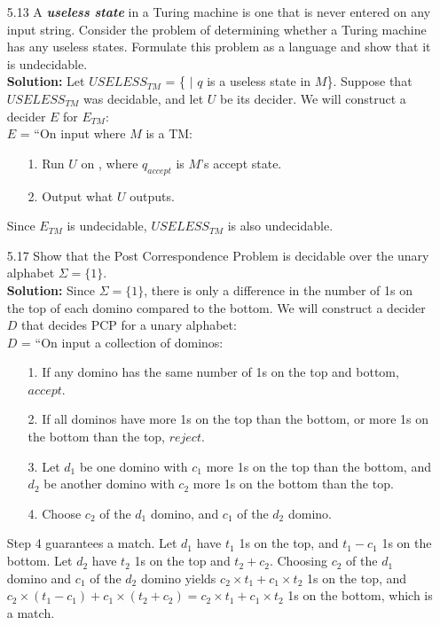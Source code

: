 \begin{enumerate}
\item[5.13]A \emph{\textbf{useless state}} in a Turing machine is one that is never entered on any input string. Consider the problem of determining whether a Turing machine has any useless states. Formulate this problem as a language and show that it is undecidable.
\\
\textbf{Solution:} Let $USELESS_{TM}$ = \{ $|$ $q$ is a useless state in $M$\}. Suppose that $USELESS_{TM}$ was decidable, and let $U$ be its decider. We will construct a decider $E$ for $E_{TM}$:
\\
$E$ = ``On input  where $M$ is a TM:
\begin{enumerate}
\itemsep0em
\item[1.]Run $U$ on , where $q_{accept}$ is $M$'s accept state.
\item[2.]Output what $U$ outputs.
\end{enumerate}
Since $E_{TM}$ is undecidable, $USELESS_{TM}$ is also undecidable.

\item[5.17]Show that the Post Correspondence Problem is decidable over the unary alphabet $\Sigma = \{1\}$.
\\
\textbf{Solution:} Since $\Sigma = \{1\}$, there is only a difference in the number of 1s on the top of each domino compared to the bottom. We will construct a decider $D$ that decides PCP for a unary alphabet:
\\
$D$ = ``On input a collection of dominos:
\begin{enumerate}
\itemsep0em
\item[1.]If any domino has the same number of 1s on the top and bottom, $accept$.
\item[2.]If all dominos have more 1s on the top than the bottom, or more 1s on the bottom than the top, $reject$.
\item[3.]Let $d_1$ be one domino with $c_1$ more 1s on the top than the bottom, and $d_2$ be another domino with $c_2$ more 1s on the bottom than the top.
\item[4.]Choose $c_2$ of the $d_1$ domino, and $c_1$ of the $d_2$ domino.
\end{enumerate}
Step 4 guarantees a match. Let $d_1$ have $t_1$ 1s on the top, and $t_1 - c_1$ 1s on the bottom. Let $d_2$ have $t_2$ 1s on the top and $t_2 + c_2$. Choosing $c_2$ of the $d_1$ domino and $c_1$ of the $d_2$ domino yields $c_2 \times t_1 + c_1 \times t_2$ 1s on the top, and $c_2 \times (t_1 - c_1) + c_1 \times (t_2 + c_2) = c_2 \times t_1 + c_1 \times t_2$ 1s on the bottom, which is a match.


\end{enumerate}
